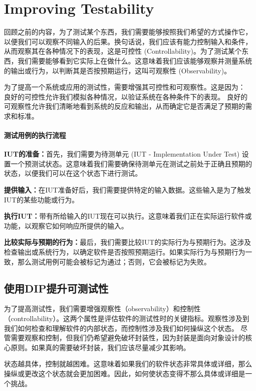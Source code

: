 \chapter{Improving Testability}

回顾之前的内容，为了测试某个东西，我们需要能够按照我们希望的方式操作它，以便我们可以观察不同输入的后果。换句话说，我们应该有能力控制输入和条件，从而观察其在各种情况下的表现，这是可控性 (Controllability)。为了测试某个东西，我们需要能够看到它实际上在做什么。这意味着我们应该能够观察并测量系统的输出或行为，以判断其是否按预期运行，这叫可观察性 (Observability)。

为了提高一个系统或应用的测试性，需要增强其可控性和可观察性。这是因为：
良好的可控性允许我们模拟各种情况，以验证系统在各种条件下的表现。
良好的可观察性允许我们清晰地看到系统的反应和输出，从而确定它是否满足了预期的需求和标准。

\subsubsection{测试用例的执行流程}

\textbf{IUT的准备：}首先，我们需要为待测单元 (IUT - Implementation Under Test) 设置一个预测试状态。这意味着我们需要确保待测单元在测试之前处于正确且预期的状态，以便我们可以在这个状态下进行测试。

\textbf{提供输入：}在IUT准备好后，我们需要提供特定的输入数据。这些输入是为了触发IUT的某些功能或行为。

\textbf{执行IUT：}带有所给输入的IUT现在可以执行。这意味着我们正在实际运行软件或功能，以观察它如何响应所提供的输入。

\textbf{比较实际与预期的行为：}最后，我们需要比较IUT的实际行为与预期行为。这涉及检查输出或系统行为，以确定软件是否按照预期运行。如果实际行为与预期行为一致，那么测试用例可能会被标记为通过；否则，它会被标记为失败。

\section{使用DIP提升可测试性}

为了提高测试性，我们需要增强观察性（observability）和控制性（controllability）。这两个属性是评估软件的测试性时的关键指标。观察性涉及到我们如何检查和理解软件的内部状态，而控制性涉及我们如何操纵这个状态。
尽管需要观察和控制，但我们仍希望避免破坏封装性，因为封装是面向对象设计的核心原则。如果真的需要破坏封装，我们应该尽量减少其影响。


状态越具体，控制就越困难。这意味着如果我们的软件状态非常具体或详细，那么操纵或更改这个状态就会更加困难。因此，如何使状态变得不那么具体或详细是一个挑战。

